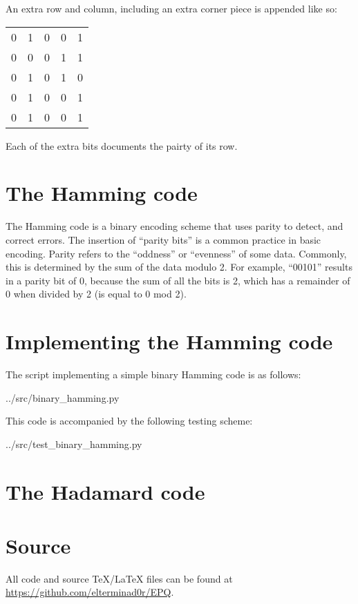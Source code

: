 \documentclass{article}
\begin{document}
    An extra row and column, including an extra corner piece is appended like
    so:

    \begin{center}
    \begin{tabular}{c c c c | c}
        0 & 1 & 0 & 0 & 1 \\ 
        0 & 0 & 0 & 1 & 1 \\
        0 & 1 & 0 & 1 & 0 \\
        0 & 1 & 0 & 0 & 1 \\ \hline
        0 & 1 & 0 & 0 & 1
   \end{tabular}
   \end{center}

   Each of the extra bits documents the pairty of its row.


    \section{The Hamming code}

    The Hamming code is a binary encoding scheme that uses parity to
    detect, and correct errors. The insertion of ``parity bits'' is a
    common practice in basic encoding. Parity refers to the ``oddness'' or
    ``evenness'' of some data. Commonly, this is determined by the sum of
    the data modulo 2. For example, ``00101'' results in a parity bit of 0,
    because the sum of all the bits is 2, which has a remainder of 0 when
    divided by 2 (is equal to 0 mod 2).

    \section{Implementing the Hamming code}

    The script implementing a simple binary Hamming code is as follows:


{../src/binary_hamming.py}

    This code is accompanied by the following testing scheme:


{../src/test_binary_hamming.py}

    \section{The Hadamard code}

    \section{Source}

    All code and source \TeX/\LaTeX{} files can be found at
    \url{https://github.com/elterminad0r/EPQ}.

\nocite{*}



\end{document}
